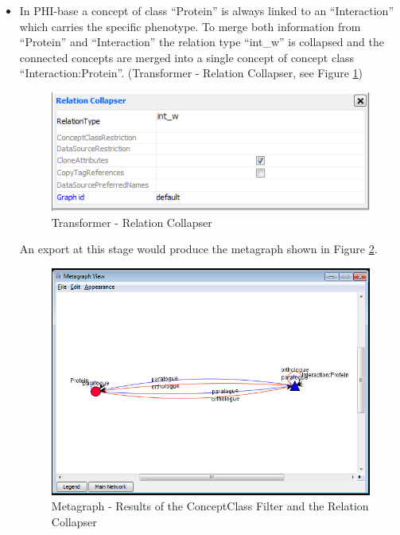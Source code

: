 \begin{itemize}
\item In PHI-base a concept of class ``Protein'' is always linked to an ``Interaction'' which carries the specific phenotype. 
To merge both information from ``Protein'' and ``Interaction'' the relation type ``int\_w'' is collapsed and 
the connected concepts are merged into a single concept of concept class ``Interaction:Protein''. 
(Transformer - Relation Collapser, see Figure \ref{fig:integrator_relationCollapser})
\begin{figure}[H]
\centering
\includegraphics[scale=0.6]{images/Oct12/relationCollapser.png} 
\caption{Transformer - Relation Collapser}
\label{fig:integrator_relationCollapser}
\end{figure}
An export at this stage would produce the metagraph shown in Figure \ref{fig:intermediate_results}.
\begin{figure}[H]
\centering
\includegraphics[scale=0.6]{images/Oct12/intermediate_results.png} 
\caption{Metagraph - Results of the ConceptClass Filter and the Relation Collapser}
\label{fig:intermediate_results}
\end{figure}


\end{itemize}
